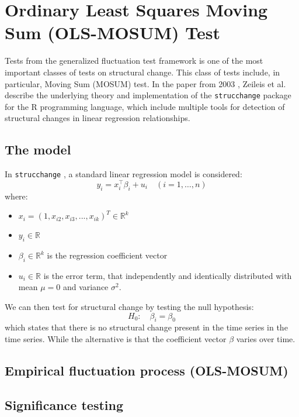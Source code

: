 \documentclass[main.tex]{subfiles}
\begin{document}
\section{Ordinary Least Squares Moving Sum (OLS-MOSUM) Test}
\label{sec:mosum}

Tests from the generalized fluctuation test framework \cite{kuan_hornik}
is one of the most important classes of tests on structural change. This class
of tests include, in particular, Moving Sum (MOSUM) test. In the paper from
2003 \cite{strucchange}, Zeileis et al. describe the underlying theory and
implementation of the \texttt{strucchange}
package for the R programming language, which include multiple tools for
detection of structural changes in linear regression relationships.

\subsection{The model}
\label{sec:mosum}
In \texttt{strucchange} \cite{strucchange}, a standard linear regression model is considered:
\[
y_{i}=x_{i}^{\top} \beta_{i}+u_{i} \quad(i=1, \ldots, n)
\]
where:
\begin{itemize}
\item $x_i = (1,x_{i2}, x_{i3}, ..., x_{ik})^T \in \mathbb{R}^k$
\item $y_i \in \mathbb{R}$
\item $\beta_i \in \mathbb{R}^{k} $ is the
  regression coefficient vector
\item $u_i \in \mathbb{R}$ is the error term, that independently and identically
  distributed with mean $\mu = 0$ and variance $\sigma^2$.
\end{itemize}
We can then test for structural change by testing the null hypothesis:
\[
H_0:\quad \beta_i = \beta_0
\]
which states that there is no structural change present in the time series in
the time series. While the alternative is that the coefficient vector $\beta$
varies over time.


\subsection{Empirical fluctuation process (OLS-MOSUM)}
\subsection{Significance testing}
\biblio
\end{document}
